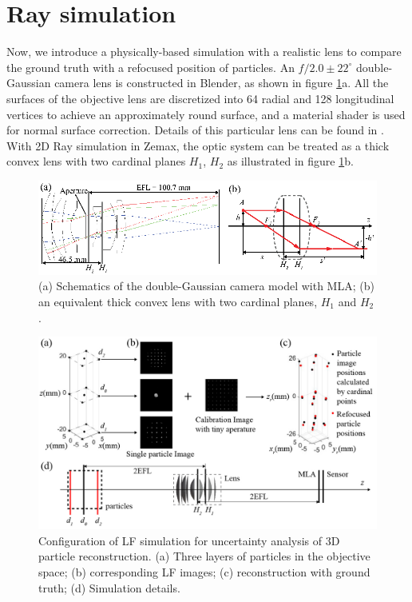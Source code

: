 \documentclass[draftthesis,fullpage]{uiucthesis}
\begin{document}
\section*{Ray simulation}\label{sec:simulation}
Now, we introduce a physically-based simulation \citep{michels2018simulation} with a realistic lens to compare the ground truth with a refocused position of particles. An $f/2.0\pm 22^{\circ}$ double-Gaussian camera lens is constructed in Blender, as shown in figure \ref{fig:simulate_lens}a. All the surfaces of the objective lens are discretized into 64 radial and 128 longitudinal vertices to achieve an approximately round surface, and a material shader is used for normal surface correction. Details of this particular lens can be found in \citet{smith2005modern}. With 2D Ray simulation in Zemax, the optic system can be treated as a thick convex lens with two cardinal planes $H_1$, $H_2$ as illustrated in figure \ref{fig:simulate_lens}b. 
\begin{figure}[h]
       \centerline{\includegraphics[width = 0.8\linewidth]{fig/figure4.eps}} 
        \caption{(a) Schematics of the double-Gaussian camera model with MLA;  (b) an equivalent thick convex lens with two cardinal planes, $H_1$ and $H_2$.}
      \label{fig:simulate_lens}
\end{figure}
\begin{figure}[h]
       \centerline{\includegraphics[width=0.8\linewidth]{fig/figure5.jpg}}
       \caption{Configuration of LF simulation for uncertainty analysis of 3D particle reconstruction. (a) Three layers of particles in the objective space; (b) corresponding LF images; (c) reconstruction with ground truth; (d) Simulation details.}
       \label{fig:simu}
\end{figure}
\end{document}
